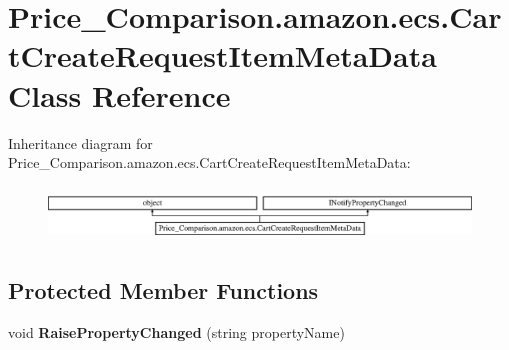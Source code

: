 \hypertarget{class_price___comparison_1_1amazon_1_1ecs_1_1_cart_create_request_item_meta_data}{\section{Price\-\_\-\-Comparison.\-amazon.\-ecs.\-Cart\-Create\-Request\-Item\-Meta\-Data Class Reference}
\label{class_price___comparison_1_1amazon_1_1ecs_1_1_cart_create_request_item_meta_data}
}


 


Inheritance diagram for Price\-\_\-\-Comparison.\-amazon.\-ecs.\-Cart\-Create\-Request\-Item\-Meta\-Data\-:\begin{figure}[H]
\begin{center}
\leavevmode
\includegraphics[height=1.469816cm]{class_price___comparison_1_1amazon_1_1ecs_1_1_cart_create_request_item_meta_data}
\end{center}
\end{figure}
\subsection*{Protected Member Functions}
\begin{DoxyCompactItemize}
\item 
\hypertarget{class_price___comparison_1_1amazon_1_1ecs_1_1_cart_create_request_item_meta_data_a230db28cdc3a4ec660317f475bf32a24}{void {\bfseries Raise\-Property\-Changed} (string property\-Name)}\label{class_price___comparison_1_1amazon_1_1ecs_1_1_cart_create_request_item_meta_data_a230db28cdc3a4ec660317f475bf32a24}

\end{DoxyCompactItemize}
